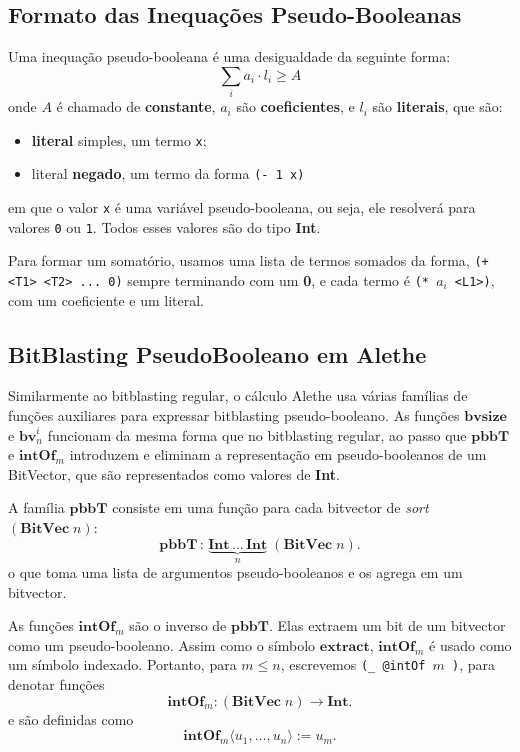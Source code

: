 \documentclass[conference]{IEEEtran}
\begin{document}
\subsection{Formato das Inequações Pseudo-Booleanas}
Uma inequação pseudo-booleana é uma desigualdade da seguinte forma:
\[
    \sum_i a_i \cdot l_i \geq A
\]
onde $A$ é chamado de \textbf{constante}, $a_i$ são \textbf{coeficientes},
e $l_i$ são \textbf{literais}, que são:
\begin{itemize}
    \item \textbf{literal} simples, um termo \texttt{x};
    \item literal \textbf{negado}, um termo da forma \texttt{(- 1 x)}
\end{itemize}

em que o valor \texttt{x} é uma variável pseudo-booleana, ou seja, ele resolverá para valores
\texttt{0} ou \texttt{1}. Todos esses valores são do tipo \textbf{Int}.

Para formar um somatório, usamos uma lista de termos somados da forma,
\texttt{(+ <T1> <T2> ... 0)} sempre terminando com um \textbf{0}, e cada termo é
\texttt{(* $a_i$ <L1>)}, com um coeficiente e um literal.

\subsection{BitBlasting PseudoBooleano em Alethe}
Similarmente ao bitblasting regular, o cálculo Alethe usa várias famílias de funções auxiliares
para expressar bitblasting pseudo-booleano.
As funções $\textbf{bvsize}$ e $\textbf{bv}_n^i$ funcionam da mesma forma que no bitblasting regular,
ao passo que $\textbf{pbbT}$ e $\textbf{intOf}_m$ introduzem e eliminam a representação em
pseudo-booleanos de um BitVector, que são representados como valores de \textbf{Int}.

A família $\textbf{pbbT}$ consiste em uma função para cada bitvector de \textit{sort} $(\textbf{BitVec}\;n)$:
\[
    \textbf{pbbT}\,:\,\underbrace{\textbf{Int}\,\dots\,\textbf{Int}}_n\;(\textbf{BitVec}\;n).
\]
o que toma uma lista de argumentos pseudo-booleanos e os agrega em um bitvector.

As funções $\textbf{intOf}_m$ são o inverso de $\textbf{pbbT}$. Elas extraem
um bit de um bitvector como um pseudo-booleano. Assim como o símbolo $\textbf{extract}$,
$\textbf{intOf}_m$ é usado como um símbolo indexado. Portanto, para $m \leq n$,
escrevemos \texttt{(\_ @intOf $m$ )}, para denotar funções
\[
    \textbf{intOf}_m : (\textbf{BitVec}\;n) \to \textbf{Int}.
\]
e são definidas como
\[
    \textbf{intOf}_m \langle u_1, \dots, u_n \rangle := u_m.
\]
\end{document}
